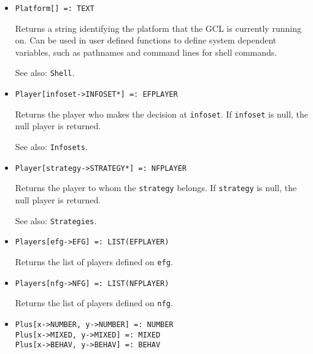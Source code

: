 \begin{itemize}
\item{}
\protect \large \begin{verbatim}
Platform[] =: TEXT 
\end{verbatim} \normalsize

\bd 
Returns a string identifying the platform that the GCL is
currently running on.  Can be used in user defined functions to define
system dependent variables, such as pathnames and command lines for
shell commands.  
\item [See also:] \verb+Shell+.
\ed

\item{}
\protect \large \begin{verbatim}
Player[infoset->INFOSET*] =: EFPLAYER 
\end{verbatim}\normalsize

\bd
Returns the player who makes the decision at \verb+infoset+.
If \verb+infoset+ is null, the null player is returned.
\item [See also:] \verb+Infosets+.
\ed

\item{}
\protect \large \begin{verbatim}
Player[strategy->STRATEGY*] =: NFPLAYER 
\end{verbatim}\normalsize

\bd
Returns the player to whom the \verb+strategy+ belongs.
If \verb+strategy+ is null, the null player is returned.
\item [See also:] \verb+Strategies+.
\ed

\item{}
\protect \large \begin{verbatim}
Players[efg->EFG] =: LIST(EFPLAYER) 
\end{verbatim} \normalsize

\bd
Returns the list of players defined on \verb+efg+.
\ed

\item{}
\protect \large \begin{verbatim}
Players[nfg->NFG] =: LIST(NFPLAYER) 
\end{verbatim} \normalsize

\bd
Returns the list of players defined on \verb+nfg+.
\ed

\item{} 
\protect \large \begin{verbatim}
Plus[x->NUMBER, y->NUMBER] =: NUMBER
Plus[x->MIXED, y->MIXED] =: MIXED
Plus[x->BEHAV, y->BEHAV] =: BEHAV
\end{verbatim} \normalsize


\end{itemize}
